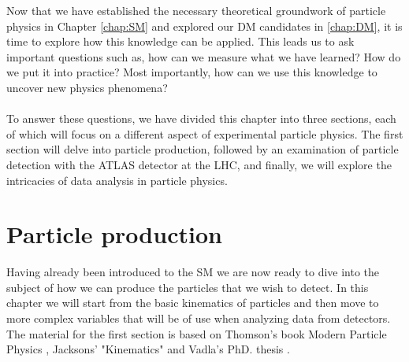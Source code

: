 \documentclass[12pt, a4paper]{book}
\begin{document}
\graphicspath{{../../figures/}}

Now that we have established the necessary theoretical groundwork of particle physics in Chapter \ref{chap:SM} and explored our DM candidates in \ref{chap:DM}, it is time to explore how this knowledge can be applied. This leads us to ask important questions such as, 
how can we measure what we have learned? How do we put it into practice? Most importantly, how can we use this knowledge to uncover new physics phenomena?\\
\\To answer these questions, we have divided this chapter into three sections, each of which will focus on a different aspect of experimental particle physics. The first section will delve into particle production, 
followed by an examination of particle detection with the ATLAS detector at the LHC, and finally, we will explore the intricacies of data analysis in particle physics.

\clearpage
\section{Particle production}
Having already been introduced to the SM we are now ready to dive into the subject of how we can produce the particles that we wish to detect. In this chapter we will start from the basic kinematics of particles 
and then move to more complex variables that will be of use when analyzing data from detectors. The material for the first section is based on Thomson's book Modern Particle Physics \cite{THOMSON}, Jacksons' "Kinematics" \cite{Jackson_kin}
and Vadla's PhD. thesis \cite{KNUT_VADLA}.
\end{document}
